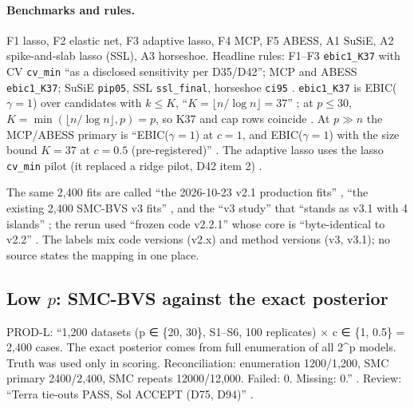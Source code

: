 \paragraph{Benchmarks and rules.} F1 lasso, F2 elastic net, F3 adaptive lasso, F4 MCP, F5 ABESS, A1 SuSiE, A2
spike-and-slab lasso (SSL), A3 horseshoe. Headline rules: F1--F3 \texttt{ebic1\_K37} with CV \texttt{cv\_min} ``as a
disclosed sensitivity per D35/D42''; MCP and ABESS \texttt{ebic1\_K37}; SuSiE \texttt{pip05}, SSL \texttt{ssl\_final},
horseshoe \texttt{ci95} . \texttt{ebic1\_K37} is
EBIC($\gamma=1$) over candidates with $k\le K$, ``$K=\lfloor n/\log n\rfloor=37$''
; at $p\le 30$, $K=\min(\lfloor n/\log n\rfloor,p)=p$, so
K37 and cap rows coincide . At $p\gg n$ the
MCP/ABESS primary is ``EBIC($\gamma=1$) at $c=1$, and EBIC($\gamma=1$) with the size bound $K=37$ at $c=0.5$
(pre-registered)'' . The adaptive lasso uses the lasso
\texttt{cv\_min} pilot (it replaced a ridge pilot, D42 item 2) .

\begin{uncertain}
The same 2,400 fits are called ``the 2026-10-23 v2.1 production fits'' , ``the existing
2,400 SMC-BVS v3 fits'' , and the ``v3 study'' that
``stands as v3.1 with 4 islands'' ; the rerun used ``frozen code v2.2.1'' whose core is
``byte-identical to v2.2'' . The labels mix code versions (v2.x)
and method versions (v3, v3.1); no source states the mapping in one place.
\end{uncertain}

\subsection{Low \texorpdfstring{$p$}{p}: SMC-BVS against the exact posterior}\label{sec:emp-lowp}

PROD-L: ``1,200 datasets (p ∈ \{20, 30\}, S1–S6, 100 replicates) × c ∈ \{1, 0.5\} = 2,400 cases. The exact posterior comes
from full enumeration of all 2\textasciicircum p models. Truth was used only in scoring. Reconciliation: enumeration 1200/1,200,
SMC primary 2400/2,400, SMC repeats 12000/12,000. Failed: 0. Missing: 0.''
. Review: ``Terra tie-outs PASS, Sol ACCEPT (D75, D94)''
.

